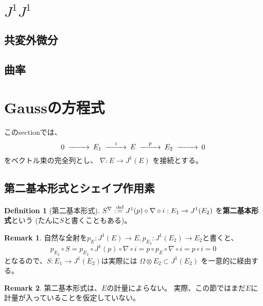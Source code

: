 \documentclass[uplatex]{jsarticle}
\theoremstyle{definition}
\newtheorem{defi}[defi]{Definition}
\newtheorem{rem}[rem]{Remark}
\newcommand{\dfn}{:\overset{\mbox{{\scriptsize def}}}{=}}
\begin{document}
\section{\(J^1J^1\)}



\subsection{共変外微分}



\subsection{曲率}











\section{Gaussの方程式}

このsectionでは、
\[
\begin{CD}
  0 @>>> E_1 @>{i}>> E @>{p}>> E_2 @>>> 0
\end{CD}
\]
をベクトル束の完全列とし、
\(\nabla:E\to J^1(E)\)
を接続とする。


\subsection{第二基本形式とシェイプ作用素}


\begin{defi}[第二基本形式]
  \(S^{\nabla}\dfn J^1(p)\circ \nabla \circ i : E_1 \to J^1(E_2)\)
  を\textbf{第二基本形式}という
  (たんに\(S\)と書くこともある)。
\end{defi}

\begin{rem}
  自然な全射を\(p_E:J^1(E)\to E, p_{E_2}:J^1(E_2)\to E_2\)と書くと、
  \[
  p_{E_2}\circ S = p_{E_2}\circ J^1(p)\circ \nabla \circ i
  = p\circ p_E \circ \nabla \circ i
  = p\circ i = 0
  \]
  となるので、\(S:E_1\to J^1(E_2)\)は実際には
  \(\Omega\otimes E_2 \subset J^1(E_2)\)
  を一意的に経由する。
\end{rem}


\begin{rem}
  第二基本形式は、\(E\)の計量によらない。
  実際、この節ではまだ\(E\)に計量が入っていることを仮定していない。
\end{rem}
\end{document}
